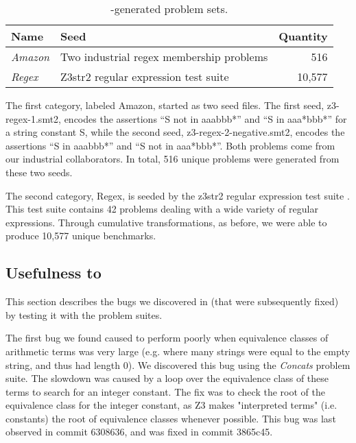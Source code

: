     \begin{table}
        \centering
        \begin{tabular}{|l|l|r|}
            \hline
            \textbf{Name}   & \textbf{Seed}                            & \textbf{Quantity} \\ \hline
            \textit{Amazon} & Two industrial regex membership problems & 516\\ \hline
            \textit{Regex}  & Z3str2 regular expression test suite     & 10,577\\ \hline
        \end{tabular}
        \caption{\transformer{}-generated problem sets.}
        \label{tbl:transformed}
    \end{table}

    The first category, labeled Amazon, started as two seed files.
    The first seed, z3-regex-1.smt2, encodes the assertions ``S not in aaabbb*'' and ``S in aaa*bbb*'' for a string constant S,
    while the second seed, z3-regex-2-negative.smt2, encodes the assertions ``S in aaabbb*'' and ``S not in aaa*bbb*''.
    Both problems come from our industrial collaborators.
    In total, 516 unique problems were generated from these two seeds.

    The second category, Regex, is seeded by the z3str2 regular expression test suite \cite{z3str2-tests}.
    This test suite contains 42 problems dealing with a wide variety of regular expressions.
    Through cumulative transformations, as before, we were able to produce 10,577 unique benchmarks.

    \subsection{Usefulness to \us{}}

        This section describes the bugs we discovered in \us{} (that were subsequently fixed) by testing it with the \fuzzer{} problem suites.

        The first bug we found caused \us{} to perform poorly when equivalence classes of arithmetic terms was very large (e.g. where many strings were equal to the empty string, and thus had length 0). We discovered this bug using the \textit{Concats} problem suite. The slowdown was caused by a loop over the equivalence class of these terms to search for an integer constant. The fix was to check the root of the equivalence class for the integer constant, as Z3 makes "interpreted terms" (i.e. constants) the root of equivalence classes whenever possible. This bug was last observed in commit 6308636, and was fixed in commit 3865c45.

